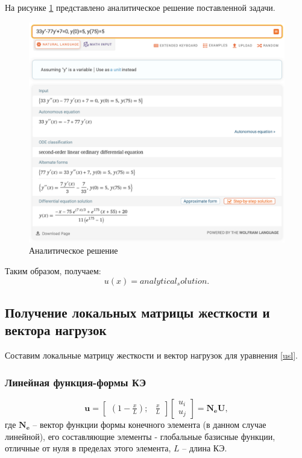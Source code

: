 На рисунке \ref{analit} представлено аналитическое решение поставленной задачи.
\begin{figure}[!h]
\begin{center}
\includegraphics[scale = 0.5]{labs/img/img1}
\end{center}
\caption{Аналитическое решение}
\label{analit}
\end{figure}

Таким образом, получаем:
$$
u(x)={{ analytical_solution }}.
$$


\subsection{Получение локальных матрицы жесткости и вектора нагрузок}

Составим локальные матрицу жесткости и вектор нагрузок для уравнения \ref{usl}.

\subsubsection{Линейная функция-формы КЭ}

$$
\mathbf{u}=\begin{bmatrix}
(1-\frac{x}{L}) ; & \frac{x}{L}
\end{bmatrix}
\begin{bmatrix}
u_i \\
u_j
\end{bmatrix}
=\mathbf{N_eU},
$$
где $\mathbf{N_e}$ -- вектор функции формы конечного элемента (в данном случае линейной), его составляющие элементы - глобальные базисные функции, отличные от нуля в пределах этого элемента, $L$ -- длина КЭ.

